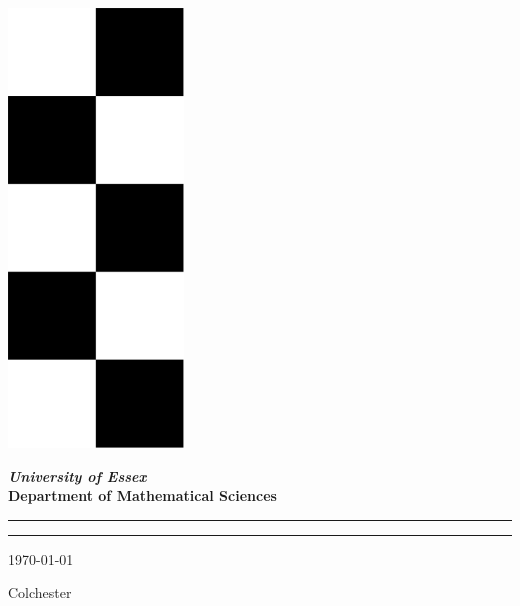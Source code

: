\documentclass[12pt, a4paper,twoside]{report}
\theoremstyle{plain} %
\theoremstyle{definition} %
\theoremstyle{remark} %
\numberwithin{equation}{chapter}
\begin{document}


\thispagestyle{empty} %

\noindent
    \begin{minipage}{0.1\textwidth}
    \includegraphics[width=0.35\textwidth]{essex.png}
    \end{minipage}
    \begin{minipage}{0.89\textwidth}
        \renewcommand\familydefault{\sfdefault}
        \selectfont
        {\Large \bf \sl University of Essex}\\[0.7em]
        {\Large \bf Department of Mathematical Sciences}
    \end{minipage}

\begin{center}
    \noindent\textcolor{myred}{\rule{\linewidth}{4.8pt}}
    
    \vspace{2em}
    
    \vspace{3em}
    
    \vspace{3em}
    \vfill
    
    \vspace{0.5em}
    \noindent\textcolor{myred}{\rule{\linewidth}{4.8pt}}
    
    \vspace{2em}
    {\Large \today }
    
    {\Large Colchester}
\end{center}

\clearpage
\tableofcontents

\label{ch:1}
\label{ch:2}


\end{document}

